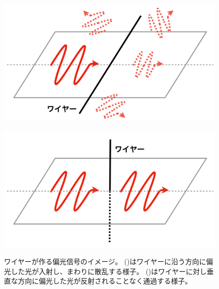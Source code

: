 \documentclass[../../main.tex]{subfiles}
\begin{document}
\begin{figure}[H]
    \begin{minipage}[b]{0.48\columnwidth}
        \centering
        \includegraphics[width=\columnwidth]{wiregrid/wire_reflect.pdf}
        \subcaption{}
        \label{fig:wire_reflect}
    \end{minipage}
    \hspace{0.02\columnwidth}
    \begin{minipage}[b]{0.48\columnwidth}
        \centering
        \includegraphics[width=\columnwidth]{wiregrid/wire_through.pdf}
        \subcaption{}
        \label{fig:wire_through}
    \end{minipage}
    \centering
    \caption{ワイヤーが作る偏光信号のイメージ。
             ()はワイヤーに沿う方向に偏光した光が入射し、まわりに散乱する様子。
             ()はワイヤーに対し垂直な方向に偏光した光が反射されることなく通過する様子。
             }
    \label{fig:wire_polarization}
\end{figure}
\end{document}
